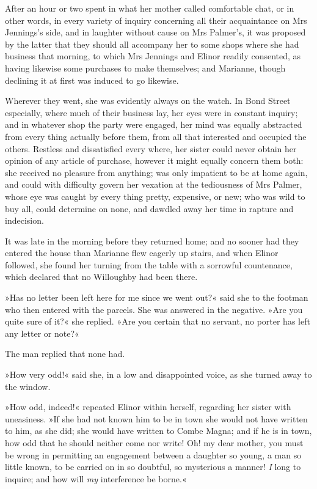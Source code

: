 After an hour or two spent in what her mother called comfortable chat, or in other words, in every variety of inquiry concerning all their acquaintance on Mrs Jennings’s side, and in laughter without cause on Mrs Palmer’s, it was proposed by the latter that they should all accompany her to some shops where she had business that morning, to which Mrs Jennings and Elinor readily consented, as having likewise some purchases to make themselves; and Marianne, though declining it at first was induced to go likewise.

Wherever they went, she was evidently always on the watch. In Bond Street especially, where much of their business lay, her eyes were in constant inquiry; and in whatever shop the party were engaged, her mind was equally abstracted from every thing actually before them, from all that interested and occupied the others. Restless and dissatisfied every where, her sister could never obtain her opinion of any article of purchase, however it might equally concern them both: she received no pleasure from anything; was only impatient to be at home again, and could with difficulty govern her vexation at the tediousness of Mrs Palmer, whose eye was caught by every thing pretty, expensive, or new; who was wild to buy all, could determine on none, and dawdled away her time in rapture and indecision.

It was late in the morning before they returned home; and no sooner had they entered the house than Marianne flew eagerly up stairs, and when Elinor followed, she found her turning from the table with a sorrowful countenance, which declared that no Willoughby had been there.

»Has no letter been left here for me since we went out?« said she to the footman who then entered with the parcels. She was answered in the negative. »Are you quite sure of it?« she replied. »Are you certain that no servant, no porter has left any letter or note?«

The man replied that none had.

»How very odd!« said she, in a low and disappointed voice, as she turned away to the window.

»How odd, indeed!« repeated Elinor within herself, regarding her sister with uneasiness. »If she had not known him to be in town she would not have written to him, as she did; she would have written to Combe Magna; and if he is in town, how odd that he should neither come nor write! Oh! my dear mother, you must be wrong in permitting an engagement between a daughter so young, a man so little known, to be carried on in so doubtful, so mysterious a manner! \textit{I} long to inquire; and how will \textit{my} interference be borne.«

